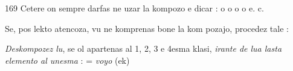 \begin{VUpage}[173]{169}
Cetere on sempre darfas ne uzar la kompozo e dicar :\nl
{} o   o \nl
{} o \nl
{} o  e. c.\parplein

\VUsaut{6.90mm}
\VUsaut{4.27mm}

Se, pos lekto atencoza, vu ne komprenas bone la kom\cc
pozajo, procedez tale :

\textit{Deskompozez lu}, se ol apartenas al 1, 2, 3 e 4esma klasi,\nl
\textit{irante de lua lasta elemento al unesma} :  = \textit{voyo} (ek)\parplein
\end{VUpage}

